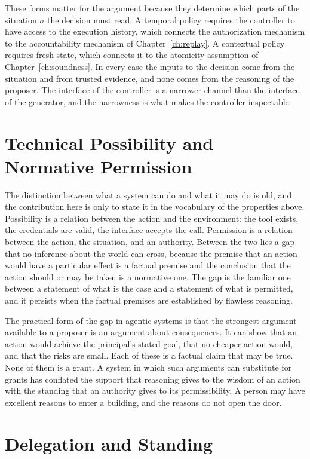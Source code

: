 These forms matter for the argument because they determine which parts of the situation $\sigma$ the decision must read. A temporal policy requires the controller to have access to the execution history, which connects the authorization mechanism to the accountability mechanism of Chapter~\ref{ch:replay}. A contextual policy requires fresh state, which connects it to the atomicity assumption of Chapter~\ref{ch:soundness}. In every case the inputs to the decision come from the situation and from trusted evidence, and none comes from the reasoning of the proposer. The interface of the controller is a narrower channel than the interface of the generator, and the narrowness is what makes the controller inspectable.

\section{Technical Possibility and Normative Permission}

The distinction between what a system can do and what it may do is old, and the contribution here is only to state it in the vocabulary of the properties above. Possibility is a relation between the action and the environment: the tool exists, the credentials are valid, the interface accepts the call. Permission is a relation between the action, the situation, and an authority. Between the two lies a gap that no inference about the world can cross, because the premise that an action would have a particular effect is a factual premise and the conclusion that the action should or may be taken is a normative one. The gap is the familiar one between a statement of what is the case and a statement of what is permitted, and it persists when the factual premises are established by flawless reasoning.

The practical form of the gap in agentic systems is that the strongest argument available to a proposer is an argument about consequences. It can show that an action would achieve the principal's stated goal, that no cheaper action would, and that the risks are small. Each of these is a factual claim that may be true. None of them is a grant. A system in which such arguments can substitute for grants has conflated the support that reasoning gives to the wisdom of an action with the standing that an authority gives to its permissibility. A person may have excellent reasons to enter a building, and the reasons do not open the door.

\section{Delegation and Standing}

